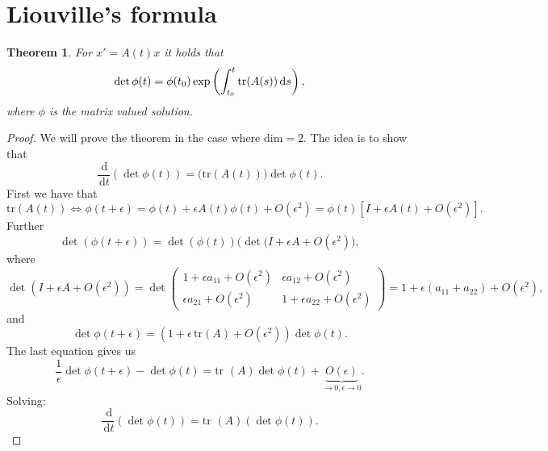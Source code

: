 \documentclass[12pt, a4paper]{article}
\newcommand{\rd}{\ensuremath{\mathrm{d}}}
\newcommand{\id}{\ensuremath{\,\rd}}
\newtheorem{theorem}{Theorem}[section]
\begin{document}
\section{Liouville's formula}
\begin{theorem}
For $x' = A(t)x$ it holds that
\begin{equation*}
\textnormal{det}\,\phi(t) = \phi(t_0)\exp\left(\int_{t_0}^t \textnormal{tr}(A(s))\id s\right),
\end{equation*}
where $\phi$ is the matrix valued solution.
\end{theorem}
\begin{proof}
We will prove the theorem in the case where dim$=2$. The idea is to show that
\begin{equation*}
\frac{\id}{\id t}(\det\phi(t)) = \big(\text{tr}(A(t))\big)\det\phi(t).
\end{equation*}
First we have that
\begin{equation*}
\text{tr}(A(t)) \Leftrightarrow \phi(t+\epsilon) = \phi(t)+\epsilon A(t)\phi(t)+O(\epsilon^2) = \phi(t)[I+\epsilon A(t) +O(\epsilon^2)].
\end{equation*}
Further
\begin{equation*}
\det(\phi(t+\epsilon)) = \det(\phi(t))\big(\det(I+\epsilon A + O(\epsilon^2)\big),
\end{equation*}
where
\begin{equation*}
\det(I+\epsilon A + O(\epsilon^2)) = \det 
\begin{pmatrix}
  1+\epsilon a_{11} + O(\epsilon^2) &  \epsilon a_{12} + O(\epsilon^2) \\
  \epsilon a_{21}+O(\epsilon^2) & 1+\epsilon a_{22}+O(\epsilon^2)
 \end{pmatrix}
 =1+\epsilon(a_{11}+a_{22})+O(\epsilon^2),
\end{equation*}
and
\begin{equation*}
\det \phi(t+\epsilon) = (1+\epsilon\,\text{tr}(A) + O(\epsilon^2))\det \phi(t).
\end{equation*}
The last equation gives us
\begin{equation*}
\frac{1}{\epsilon} \det \phi(t+\epsilon) - \det \phi(t) = \text{tr }(A)\det \phi(t) + \underbrace{O(\epsilon)}_{\to 0, \epsilon \to 0}.
\end{equation*}
Solving:
\begin{equation*}
\frac{\id}{\id t}(\det\phi(t)) = \text{tr }(A)(\det\phi(t)).
\end{equation*}
\end{proof}
\end{document}
